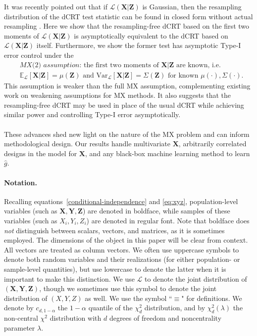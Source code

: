 \documentclass[ejs]{imsart}
\numberwithin{equation}{section}
\theoremstyle{plain}
\theoremstyle{definition}
\theoremstyle{remark}
\newcommand{\prx}{\bm X}
\newcommand{\srx}{X}
\newcommand{\prz}{\bm Z}
\newcommand{\srz}{Z}
\newcommand{\pry}{{\bm Y}}
\newcommand{\sry}{Y}
\begin{document}
It was recently pointed out that if $\mathcal L(\prx|\prz)$ is Gaussian, then the resampling distribution of the dCRT test statistic can be found in closed form without actual resampling \cite{Liu2020}. Here we show that the resampling-free dCRT based on the first two moments of $\mathcal L(\prx|\prz)$ is asymptotically equivalent to the dCRT based on $\mathcal L(\prx|\prz)$ itself. Furthermore, we show the former test has asymptotic Type-I error control under the
\begin{equation}
	\begin{split}
		&\textit{MX(2) assumption:} \text{ the first two moments of $\prx|\prz$ are known, i.e.} \\
		&\mathbb E_{\mathcal L}[\prx|\prz] = \mu(\prz) \text{ and } \text{Var}_{\mathcal L}[\prx|\prz] = \Sigma(\prz) \text{ for known } \mu(\cdot), \Sigma(\cdot).
		\label{MX(2)-intro}
	\end{split}
\end{equation}
This assumption is weaker than the full MX assumption, complementing existing work \cite{Huang2019, Barber2020} on weakening assumptions for MX methods. It also suggests that the resampling-free dCRT may be used in place of the usual dCRT while achieving similar power and controlling Type-I error asymptotically.


\paragraph*{}

These advances shed new light on the nature of the MX problem and can inform methodological design. Our results handle multivariate $\prx$, arbitrarily correlated designs in the model for $\prx$, and any black-box machine learning method to learn $\widehat g$. 
\paragraph{Notation.}

Recalling equations~\eqref{conditional-independence} and \eqref{eq:xyz}, population-level variables (such as $\prx,\pry,\prz$) are denoted in boldface, while samples of these variables (such as $\srx_i,\sry_i,\srz_i$) are denoted in regular font. Note that boldface does \textit{not} distinguish between scalars, vectors, and matrices, as it is sometimes employed. The dimensions of the object in this paper will be clear from context. All vectors are treated as column vectors. 
We often use uppercase symbols to denote both random variables and their realizations (for either population- or sample-level quantities), but use lowercase to denote the latter when it is important to make this distinction. We use $\mathcal L$ to denote the joint distribution of $(\prx,\pry,\prz)$, though we sometimes use this symbol to denote the joint distribution of $(\srx,\sry,\srz)$ as well. We use the symbol ``$\equiv$" for definitions. We denote by $c_{d,1-\alpha}$ the $1-\alpha$ quantile of the $\chi^2_d$ distribution, and by $\chi^2_d(\lambda)$ the non-central $\chi^2$ distribution with $d$ degrees of freedom and noncentrality parameter $\lambda$.
\end{document}
